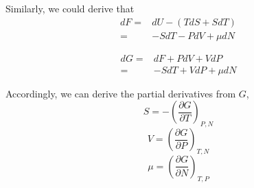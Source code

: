 Similarly, we could derive that 
\begin{equation} 
\begin{split}
dF  = &  dU - (TdS + SdT)   \\
    = & -SdT  - PdV + \mu dN 
\end{split}
\end{equation}

\begin{equation} 
\begin{split}
dG  = & dF + PdV + VdP   \\
    = & -SdT + VdP + \mu dN 
\end{split}
\end{equation}

Accordingly, we can derive the partial derivatives from $G$,
\begin{equation} S   = -(\frac{\partial {G}}{\partial {T}})_{P,N} \end{equation}
\begin{equation} V   = (\frac{\partial {G}}{\partial {P}})_{T,N} \end{equation}
\begin{equation}\mu  = (\frac{\partial {G}}{\partial {N}})_{T,P} \end{equation}


